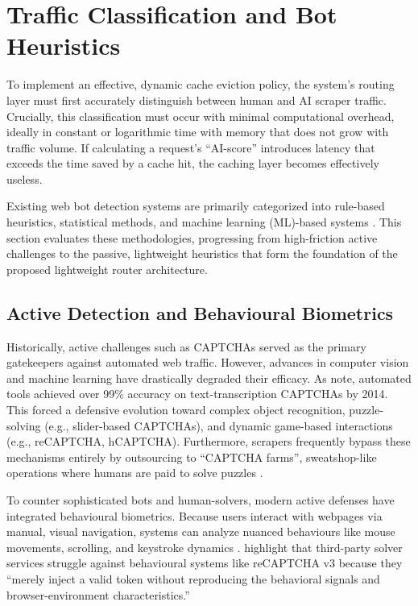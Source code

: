 \section{Traffic Classification and Bot Heuristics}
To implement an effective, dynamic cache eviction policy, the system’s routing layer must first accurately distinguish between human and AI scraper traffic. Crucially, this classification must occur with minimal computational overhead, ideally in constant or logarithmic time with memory that does not grow with traffic volume. If calculating a request's ``AI-score'' introduces latency that exceeds the time saved by a cache hit, the caching layer becomes effectively useless.

Existing web bot detection systems are primarily categorized into rule-based heuristics, statistical methods, and machine learning (ML)-based systems \cite{martinez_llamas_balancing_2025}. This section evaluates these methodologies, progressing from high-friction active challenges to the passive, lightweight heuristics that form the foundation of the proposed lightweight router architecture.

\subsection{Active Detection and Behavioural Biometrics}
Historically, active challenges such as CAPTCHAs served as the primary gatekeepers against automated web traffic. However, advances in computer vision and machine learning have drastically degraded their efficacy. As  note, automated tools achieved over 99\% accuracy on text-transcription CAPTCHAs by 2014. This forced a defensive evolution toward complex object recognition, puzzle-solving (e.g., slider-based CAPTCHAs), and dynamic game-based interactions (e.g., reCAPTCHA, hCAPTCHA). Furthermore, scrapers frequently bypass these mechanisms entirely by outsourcing to ``CAPTCHA farms'', sweatshop-like operations where humans are paid to solve puzzles \cite{searles_empirical_2023}.

To counter sophisticated bots and human-solvers, modern active defenses have integrated behavioural biometrics. Because users interact with webpages via manual, visual navigation, systems can analyze nuanced behaviours like mouse movements, scrolling, and keystroke dynamics \cite{martinez_llamas_balancing_2025}.  highlight that third-party solver services struggle against behavioural systems like reCAPTCHA v3 because they ``merely inject a valid token without reproducing the behavioral signals and browser-environment characteristics.''

